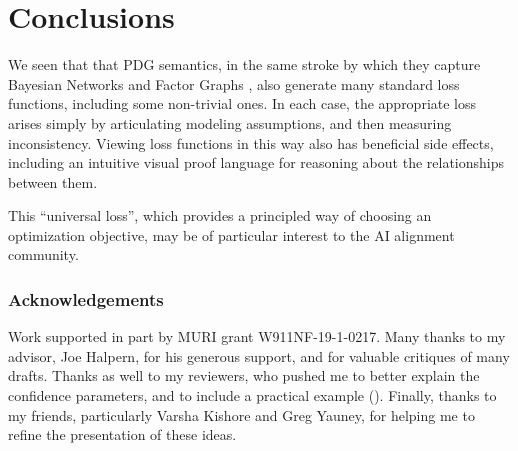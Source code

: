 \section{Conclusions}


We seen that that PDG semantics, in the same stroke by which they capture Bayesian Networks and Factor Graphs \parencite{pdg-aaai}, also generate
many standard loss functions, including some non-trivial ones.
In each case, the appropriate loss arises simply by articulating modeling assumptions, and then measuring inconsistency.
Viewing loss functions in this way also has beneficial side effects, including an intuitive visual proof language for reasoning about the relationships between them.

This ``universal loss'',
which provides a principled way of choosing an optimization objective,
may be of particular interest to the AI alignment community.


\newpage
\subsubsection*{Acknowledgements}
Work supported in part by MURI grant W911NF-19-1-0217.
Many thanks to my advisor, Joe Halpern, for his generous support, and for valuable critiques of many drafts. Thanks as well to my reviewers, who pushed me to better explain the confidence parameters, and to include a practical example ().
Finally, thanks to my friends, particularly Varsha Kishore and Greg Yauney, for helping me to refine the presentation of these ideas.



